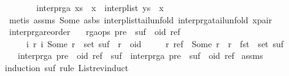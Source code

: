 \begin{isabellebody}
\ \ \ \ \isamarkupfalse%
\ \isamarkupfalse%
\ {\isachardoublequoteopen}interp{\isacharunderscore}rga\ {\isacharparenleft}xs\ {\isacharat}\ {\isacharbrackleft}x{\isacharbrackright}{\isacharparenright}\ {\isacharequal}\ interp{\isacharunderscore}list\ {\isacharparenleft}ys\ {\isacharat}\ {\isacharbrackleft}x{\isacharbrackright}{\isacharparenright}{\isachardoublequoteclose}\ \isanewline
\ \ \ \ \ \ \isamarkupfalse%
\ {\isacharparenleft}metis\ assms{\isacharparenleft}{}{\isacharparenright}\ Some\ as{\isacharunderscore}bs\ interp{\isacharunderscore}list{\isacharunderscore}tail{\isacharunderscore}unfold\ interp{\isacharunderscore}rga{\isacharunderscore}tail{\isacharunderscore}unfold\ x{\isacharunderscore}pair{\isacharparenright}\isanewline
\ \ \isamarkupfalse%
\isanewline
{}\isamarkupfalse%
%
\endisatagproof
{\isafoldproof}%
%
\isadelimproof
\isanewline
%
\endisadelimproof
\isanewline
{}\isamarkupfalse%
\ interp{\isacharunderscore}rga{\isacharunderscore}reorder{\isacharcolon}\isanewline
\ \ \ {\isachardoublequoteopen}rga{\isacharunderscore}ops\ {\isacharparenleft}pre\ {\isacharat}\ suf\ {\isacharat}\ {\isacharbrackleft}{\isacharparenleft}oid{\isacharcomma}\ ref{\isacharparenright}{\isacharbrackright}{\isacharparenright}{\isachardoublequoteclose}\isanewline
\ \ \ \ \ {\isachardoublequoteopen}{\isasymAnd}i\ r{\isachardot}\ {\isacharparenleft}i{\isacharcomma}\ Some\ r{\isacharparenright}\ {\isasymin}\ set\ suf\ {\isasymLongrightarrow}\ r\ {\isasymnoteq}\ oid{\isachardoublequoteclose}\isanewline
\ \ \ \ \ {\isachardoublequoteopen}{\isasymAnd}r{\isachardot}\ ref\ {\isacharequal}\ Some\ r\ {\isasymLongrightarrow}\ r\ {\isasymnotin}\ fst\ {\isacharbackquote}\ set\ suf{\isachardoublequoteclose}\isanewline
\ \ \ {\isachardoublequoteopen}interp{\isacharunderscore}rga\ {\isacharparenleft}pre\ {\isacharat}\ {\isacharparenleft}oid{\isacharcomma}\ ref{\isacharparenright}\ {\isacharhash}\ suf{\isacharparenright}\ {\isacharequal}\ interp{\isacharunderscore}rga\ {\isacharparenleft}pre\ {\isacharat}\ suf\ {\isacharat}\ {\isacharbrackleft}{\isacharparenleft}oid{\isacharcomma}\ ref{\isacharparenright}{\isacharbrackright}{\isacharparenright}{\isachardoublequoteclose}\isanewline
%
\isadelimproof
%
\endisadelimproof
%
\isatagproof
{}\isamarkupfalse%
\ assms\ \isamarkupfalse%
{\isacharparenleft}induction\ suf\ rule{\isacharcolon}\ List{\isachardot}rev{\isacharunderscore}induct{\isacharparenright}\isanewline

\end{isabellebody}
